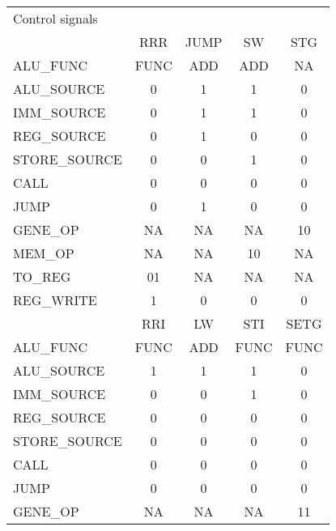 \begin{table}
    \centering
    \begin{tabular}{| l | c | c | c |c |}
    \hline
    Control signals   &              &          &        &           \\[0.5ex]
                      & RRR          & JUMP     &  SW    &  STG       \\
    \hline
    ALU\_FUNC         & FUNC         & ADD      &  ADD   &  NA        \\ 
    ALU\_SOURCE       &  0           & 1        &  1     &  0         \\
    IMM\_SOURCE       &  0           & 1        &  1     &  0         \\
    REG\_SOURCE       &  0           & 1        &  0     &  0         \\
    STORE\_SOURCE     &  0           & 0        &  1     &  0         \\
    CALL              &  0           & 0        &  0     &  0         \\
    JUMP              &  0           & 1        &  0     &  0         \\
    GENE\_OP          &  NA          & NA       &  NA    &  10        \\
    MEM\_OP           &  NA          & NA       &  10    &  NA        \\
    TO\_REG           &  01          & NA       &  NA    &  NA        \\
    REG\_WRITE        &  1           & 0        &  0     &  0         \\
    \hline  
                      & RRI          & LW       & STI    & SETG       \\
    \hline
    ALU\_FUNC         & FUNC         & ADD      & FUNC   & FUNC       \\
    ALU\_SOURCE       &  1           &  1       &  1     &  0         \\
    IMM\_SOURCE       &  0           &  0       &  1     &  0         \\
    REG\_SOURCE       &  0           &  0       &  0     &  0         \\
    STORE\_SOURCE     &  0           &  0       &  0     &  0         \\
    CALL              &  0           &  0       &  0     &  0         \\
    JUMP              &  0           &  0       &  0     &  0         \\
    GENE\_OP          &  NA          &  NA      &  NA    &  11        \\

\end{tabular}
\end{table}
